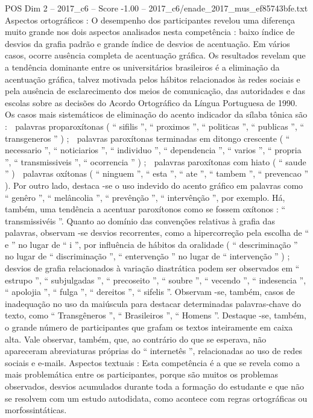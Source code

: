 \begin{textsample}{POS Dim 2 – 2017\_c6 – Score -1.00 – 2017\_c6/enade\_2017\_mus\_ef85743bfe.txt}
Aspectos ortográficos : O desempenho dos participantes revelou uma diferença muito grande nos dois aspectos analisados nesta competência : baixo índice de desvios da grafia padrão e grande índice de desvios de acentuação.
Em vários casos, ocorre ausência completa de acentuação gráfica.
Os resultados revelam que a tendência dominante entre os universitários brasileiros é a eliminação da acentuação gráfica, talvez motivada pelos hábitos relacionados às redes sociais e pela ausência de esclarecimento dos meios de comunicação, das autoridades e das escolas sobre as decisões do Acordo Ortográfico da Língua Portuguesa de 1990.
Os casos mais sistemáticos de eliminação do acento indicador da sílaba tônica são :  palavras proparoxítonas ( “ sifilis ”, “ proximos ”, “ politicas ”, “ publicas ”, “ transgeneros ” ) ;  palavras paroxítonas terminadas em ditongo crescente ( “ necessario ”, “ noticiarios ”, “ individuo ”, “ dependencia ”, “ varios ”, “ propria ”, “ transmissiveis ”, “ ocorrencia ” ) ;  palavras paroxítonas com hiato ( “ saude ” )  palavras oxítonas ( “ ninguem ”, “ esta ”, “ ate ”, “ tambem ”, “ prevencao ” ).
Por outro lado, destaca -se o uso indevido do acento gráfico em palavras como “ genêro ”, “ melâncolia ”, “ prevênção ”, “ intervênção ”, por exemplo.
Há, também, uma tendência a acentuar paroxítonos como se fossem oxítonos : “ transmissivéis ”.
Quanto ao domínio das convenções relativas à grafia das palavras, observam -se desvios recorrentes, como a hipercorreção pela escolha de “ e ” no lugar de “ i ”, por influência de hábitos da oralidade ( “ descriminação ” no lugar de “ discriminação ”, “ entervenção ” no lugar de “ intervenção ” ) ; desvios de grafia relacionados à variação diastrática podem ser observados em “ estrupo ”, “ subjulgadas ”, “ precoseito ”, “ soubre ”, “ vecendo ”, “ indesencia ”, “ apolojia ”, “ fulga ”, “ dereitos ”, “ sifelis ”.
Observam -se, também, casos de inadequação no uso da maiúscula para destacar determinadas palavras-chave do texto, como “ Transgêneros ”, “ Brasileiros ”, “ Homens ”.
Destaque -se, também, o grande número de participantes que grafam os textos inteiramente em caixa alta.
Vale observar, também, que, ao contrário do que se esperava, não apareceram abreviaturas próprias do “ internetês ”, relacionadas ao uso de redes sociais e e-mails.
Aspectos textuais : Esta competência é a que se revela como a mais problemática entre os participantes, porque são muitos os problemas observados, desvios acumulados durante toda a formação do estudante e que não se resolvem com um estudo autodidata, como acontece com regras ortográficas ou morfossintáticas.

\end{textsample}
